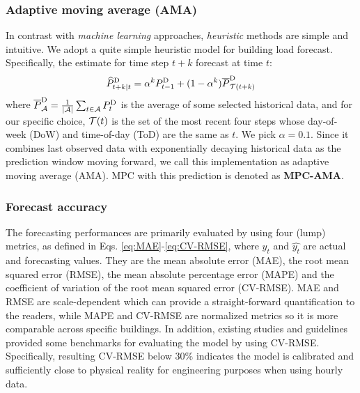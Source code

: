 \subsubsection{Adaptive moving average (AMA)}

In contrast with \emph{machine learning} approaches, \emph{heuristic} methods are simple and intuitive. We adopt a quite simple heuristic model for building load forecast. Specifically, the estimate for time step $t+k$ forecast at time $t$:
\begin{equation}
    \widehat{P}^\text{D}_{t+k \mid t} = \alpha^k P^\text{D}_{t-1} + (1 - \alpha^k) \overline{P}^{\text{D}}_{\mathcal{T}(t+k)} 
\end{equation}
where $\overline{P}^{\text{D}}_{\mathcal{A}} = \frac{1}{\abs{\mathcal{A}}}\sum_{t\in \mathcal{A}} P^\text{D}_t$ is the average of some selected historical data, and for our specific choice, $\mathcal{T}(t)$ is the set of the most recent four steps whose day-of-week (DoW) and time-of-day (ToD) are the same as $t$. We pick $\alpha = 0.1$. 
Since it combines last observed data with exponentially decaying historical data as the prediction window moving forward, we call this implementation as adaptive moving average (AMA). MPC with this prediction is denoted as \textbf{MPC-AMA}.


\subsubsection{Forecast accuracy}
    
The forecasting performances are primarily evaluated by using four (lump) metrics, as defined in Eqs. \eqref{eq:MAE}-\eqref{eq:CV-RMSE}, where $y_t$ and $\widehat{y_t}$ are actual and forecasting values. They are the mean absolute error (MAE), the root mean squared error (RMSE), the mean absolute percentage error (MAPE) and the coefficient of variation of the root mean squared error (CV-RMSE). MAE and RMSE are scale-dependent which can provide a straight-forward quantification to the readers, while MAPE and CV-RMSE are normalized metrics so it is more comparable across specific buildings. In addition, existing studies and guidelines provided some benchmarks for evaluating the model by using CV-RMSE. Specifically, resulting CV-RMSE below 30\% indicates the model is calibrated and sufficiently close to physical reality for engineering purposes when using hourly data\cite{CV-RMSE_standard}.  

